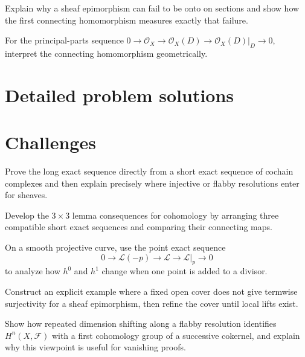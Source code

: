 \begin{problem}\label{prob:vi48-11}
Explain why a sheaf epimorphism can fail to be onto on sections and show how the first connecting homomorphism measures exactly that failure.
\end{problem}

\begin{problem}\label{prob:vi48-12}
For the principal-parts sequence $0\to\mathcal O_X\to\mathcal O_X(D)\to\mathcal O_X(D)|_D\to0$, interpret the connecting homomorphism geometrically.
\end{problem}

\ifdefined\FullProblemDossiers
\section{Detailed problem solutions}

\fi

\section{Challenges}
\begin{problem}[Challenge]\label{chal:vi48-01}
Prove the long exact sequence directly from a short exact sequence of cochain complexes and then explain precisely where injective or flabby resolutions enter for sheaves.
\end{problem}

\begin{problem}[Challenge]\label{chal:vi48-02}
Develop the $3\times3$ lemma consequences for cohomology by arranging three compatible short exact sequences and comparing their connecting maps.
\end{problem}

\begin{problem}[Challenge]\label{chal:vi48-03}
On a smooth projective curve, use the point exact sequence\[0\to\mathcal L(-p)\to\mathcal L\to\mathcal L|_p\to0\]to analyze how $h^0$ and $h^1$ change when one point is added to a divisor.
\end{problem}

\begin{problem}[Challenge]\label{chal:vi48-04}
Construct an explicit example where a fixed open cover does not give termwise surjectivity for a sheaf epimorphism, then refine the cover until local lifts exist.
\end{problem}

\begin{problem}[Challenge]\label{chal:vi48-05}
Show how repeated dimension shifting along a flabby resolution identifies $H^n(X,\mathcal F)$ with a first cohomology group of a successive cokernel, and explain why this viewpoint is useful for vanishing proofs.
\end{problem}


